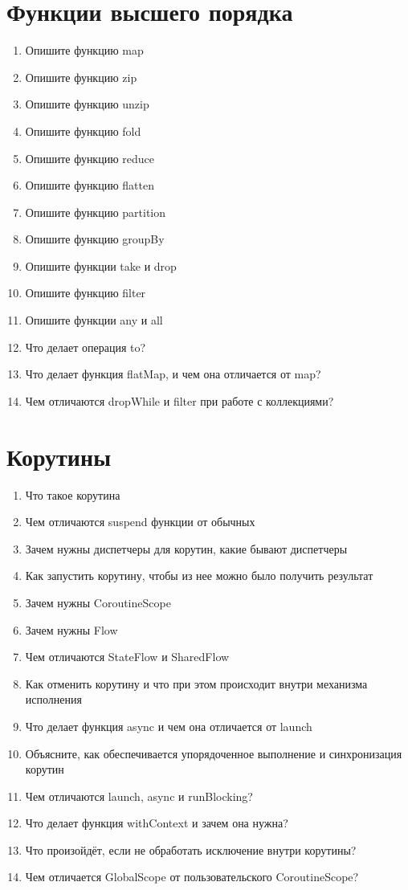 \documentclass[12pt]{article}
\begin{document}
\section*{Функции высшего порядка}
\begin{enumerate}
  \item Опишите функцию map
  \item Опишите функцию zip
  \item Опишите функцию unzip
  \item Опишите функцию fold
  \item Опишите функцию reduce
  \item Опишите функцию flatten
  \item Опишите функцию partition
  \item Опишите функцию groupBy
  \item Опишите функции take и drop
  \item Опишите функцию filter
  \item Опишите функции any и all
  \item Что делает операция to?
  \item Что делает функция flatMap, и чем она отличается от map?
  \item Чем отличаются dropWhile и filter при работе с коллекциями?
\end{enumerate}

\section*{Корутины}
\begin{enumerate}
  \item Что такое корутина
  \item Чем отличаются suspend функции от обычных
  \item Зачем нужны диспетчеры для корутин, какие бывают диспетчеры
  \item Как запустить корутину, чтобы из нее можно было получить результат
  \item Зачем нужны CoroutineScope
  \item Зачем нужны Flow
  \item Чем отличаются StateFlow и SharedFlow
  \item Как отменить корутину и что при этом происходит внутри механизма исполнения
  \item Что делает функция async и чем она отличается от launch
  \item Объясните, как обеспечивается упорядоченное выполнение и синхронизация корутин
  \item Чем отличаются launch, async и runBlocking?
  \item Что делает функция withContext и зачем она нужна?
  \item Что произойдёт, если не обработать исключение внутри корутины?
  \item Чем отличается GlobalScope от пользовательского CoroutineScope?
\end{enumerate}
\end{document}
